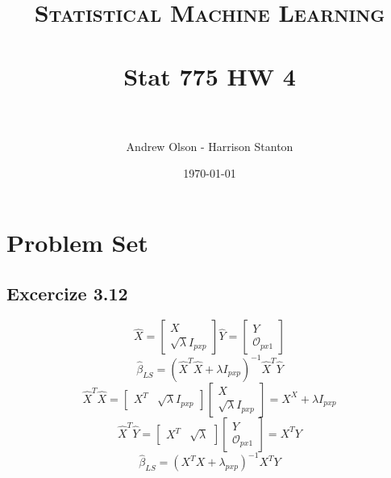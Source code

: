 \documentclass[paper=a4, fontsize=11pt]{scrartcl} %
\title{	
\normalfont \normalsize 
\textsc{Statistical Machine Learning} \\ [25pt] %
\horrule{0.5pt} \\[0.4cm] %
\huge Stat 775 HW 4 \\ %
\horrule{2pt} \\[0.5cm] %
}
\author{Andrew Olson - Harrison Stanton} %
\date{\normalsize\today} %
\numberwithin{equation}{section} %
\numberwithin{figure}{section} %
\numberwithin{table}{section} %
\theoremstyle{statement}
\begin{document}
\maketitle %


\section{Problem Set}
\subsection{Excercize 3.12}

\[
    \hat{X} = 
    \begin{bmatrix}
        X\\
        \sqrt{\lambda} I_{pxp}        
    \end{bmatrix}    
    \hat{Y} = 
    \begin{bmatrix}
        Y\\
        \mathcal O_{px1}       
    \end{bmatrix}
\]
\[
    \hat{\beta}_{LS} = (\hat{X}^T\hat{X} + \lambda I_{pxp})^{-1}\hat{X}^T\hat{Y}
\]
\[
    \hat{X}^T\hat{X} = 
    \begin{bmatrix}
        X^T & \sqrt{\lambda}I_{pxp}
    \end{bmatrix}
    \begin{bmatrix}
        X\\
        \sqrt{\lambda}I_{pxp}
    \end{bmatrix}
    = X^X + \lambda I_{pxp}
\]
\[
    \hat{X}^T\hat{Y} = 
    \begin{bmatrix}
        X^T & \sqrt{\lambda}
    \end{bmatrix}
    \begin{bmatrix}
        Y\\
        \mathcal{O}_{px1}    
    \end{bmatrix}
    = X^TY
\]
\[
    \hat{\beta}_{LS} = (X^TX + \lambda_{pxp})^{-1}X^TY
\]
\end{document}
